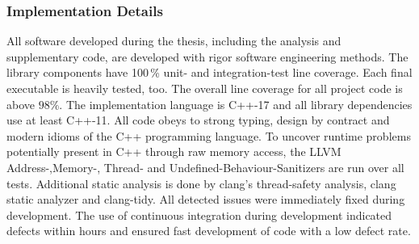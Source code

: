 \subsubsection{Implementation Details}

All software developed during the thesis, including the analysis and supplementary code, are developed with rigor software engineering methods.
The library components have 100\,\% unit- and integration-test line coverage.
Each final executable is heavily tested, too.
The overall line coverage for all project code is above $98\%$.
The implementation language is C++-17\cite{c++17} and all library dependencies use at least C++-11\cite{c++11}.
All code obeys to strong typing, design by contract\cite{meyer_ieee1992} and modern idioms of the C++ programming language\cite{stroustrup_cpppl2013}.
To uncover runtime problems potentially present in C++ through raw memory access, the LLVM Address-,\linebreak Memory-, Thread- and Undefined-Behaviour-Sanitizers\cite{google_sanitizers} are run over all tests.
Additional static analysis is done by clang's thread-safety analysis\cite{clang_thread_safety}, clang static analyzer\cite{clang_static_analyzer} and clang-tidy\cite{babati2017static}.
All detected issues were immediately fixed during development.
The use of continuous integration\cite{fowler_ci2000} during development indicated defects within hours and ensured fast development of code with a low defect rate.

